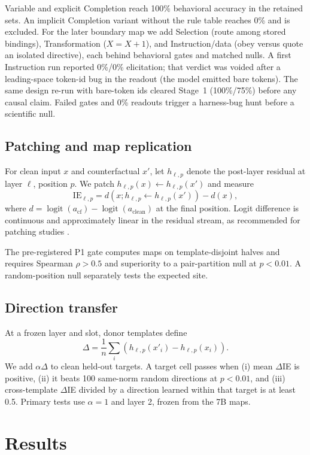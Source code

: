 \documentclass[10pt]{article}
\begin{document}
Variable and explicit Completion reach 100\% behavioral accuracy in the retained
sets. An implicit Completion variant without the rule table reaches 0\% and is
excluded. For the later boundary map we add Selection (route among stored
bindings), Transformation ($X{=}X{+}1$), and Instruction/data (obey versus quote
an isolated directive), each behind behavioral gates and matched nulls. A first
Instruction run reported 0\%/0\% elicitation; that verdict was voided after a
leading-space token-id bug in the readout (the model emitted bare tokens). The
same design re-run with bare-token ids cleared Stage~1 (100\%/75\%) before any
causal claim. Failed gates and 0\% readouts trigger a harness-bug hunt before a
scientific null.

\subsection{Patching and map replication}

For clean input $x$ and counterfactual $x'$, let $h_{\ell,p}$ denote the
post-layer residual at layer $\ell$, position $p$. We patch
$h_{\ell,p}(x)\leftarrow h_{\ell,p}(x')$ and measure
\[
  \mathrm{IE}_{\ell,p}
  = d\!\left(x;h_{\ell,p}\leftarrow h_{\ell,p}(x')\right)-d(x),
\]
where $d=\operatorname{logit}(a_{\mathrm{cf}})
-\operatorname{logit}(a_{\mathrm{clean}})$ at the final position. Logit
difference is continuous and approximately linear in the residual stream, as
recommended for patching studies \citep{heimersheim2024patching}.

The pre-registered P1 gate computes maps on template-disjoint halves and
requires Spearman $\rho>0.5$ and superiority to a pair-partition null at
$p<0.01$. A random-position null separately tests the expected site.

\subsection{Direction transfer}

At a frozen layer and slot, donor templates define
\[
  \Delta = \frac{1}{n}\sum_i
  \left(h_{\ell,p}(x'_i)-h_{\ell,p}(x_i)\right).
\]
We add $\alpha\Delta$ to clean held-out targets. A target cell passes when
(i) mean $\Delta$IE is positive, (ii) it beats 100 same-norm random directions
at $p<0.01$, and (iii) cross-template $\Delta$IE divided by a direction learned
within that target is at least 0.5. Primary tests use $\alpha=1$ and layer 2,
frozen from the 7B maps.

\section{Results}
\end{document}
